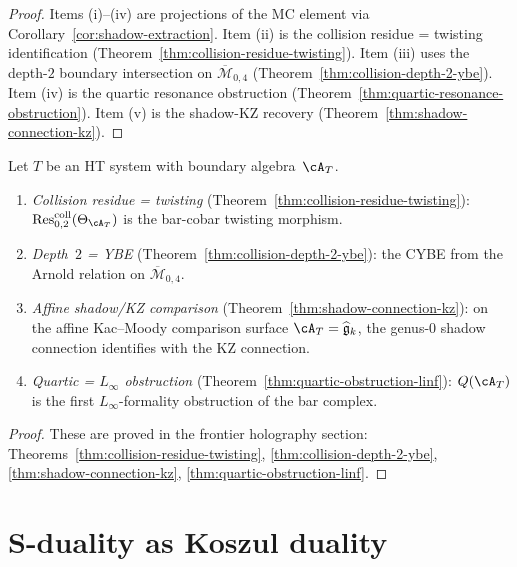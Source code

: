 \begin{proof}
Items (i)--(iv) are projections of the MC element via
Corollary~\ref{cor:shadow-extraction}. Item (ii) is the
collision residue = twisting identification
(Theorem~\ref{thm:collision-residue-twisting}). Item (iii) uses
the depth-$2$ boundary intersection on
$\overline{\mathcal{M}}_{0,4}$
(Theorem~\ref{thm:collision-depth-2-ybe}).
Item (iv) is the quartic resonance obstruction
(Theorem~\ref{thm:quartic-resonance-obstruction}).
Item (v) is the shadow-KZ recovery
(Theorem~\ref{thm:shadow-connection-kz}).
\end{proof}

\begin{proposition}
\label{prop:ht-four-recovery}
Let $T$ be an HT system with boundary algebra~$\cA_T$.
\begin{enumerate}[label=\textup{(\roman*)}]
\item \emph{Collision residue = twisting}
 \textup{(}Theorem~\textup{\ref{thm:collision-residue-twisting}}\textup{)}:
 $\operatorname{Res}^{\mathrm{coll}}_{0,2}(\Theta_{\cA_T})$
 is the bar-cobar twisting morphism.
\item \emph{Depth~$2$ = YBE}
 \textup{(}Theorem~\textup{\ref{thm:collision-depth-2-ybe}}\textup{)}:
 the CYBE from the Arnold relation on
 $\overline{\mathcal{M}}_{0,4}$.
\item \emph{Affine shadow/KZ comparison}
 \textup{(}Theorem~\textup{\ref{thm:shadow-connection-kz}}\textup{)}:
 on the affine Kac--Moody comparison surface
 $\cA_T = \widehat{\mathfrak{g}}_k$, the genus-$0$ shadow
 connection identifies with the KZ connection.
\item \emph{Quartic = $L_\infty$ obstruction}
 \textup{(}Theorem~\textup{\ref{thm:quartic-obstruction-linf}}\textup{)}:
 $Q(\cA_T)$ is the first $L_\infty$-formality obstruction of the
 bar complex.
\end{enumerate}
\end{proposition}

\begin{proof}
These are proved in the frontier holography section:
Theorems~\ref{thm:collision-residue-twisting},
\ref{thm:collision-depth-2-ybe},
\ref{thm:shadow-connection-kz},
\ref{thm:quartic-obstruction-linf}.
\end{proof}

\section{S-duality as Koszul duality}
\label{sec:ht-s-duality-koszul}

